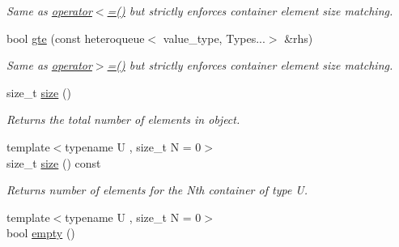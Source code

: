 \begin{DoxyCompactItemize}
\begin{DoxyCompactList}\small\item\em Same as \hyperlink{classheterogeneous_1_1heteroqueue_3_01_t_00_01_types_8_8_8_4_ac442daf94f1dc7d753cd7d493b988ae2}{operator$<$=()} but strictly enforces container element size matching. \end{DoxyCompactList}\item 
\hypertarget{classheterogeneous_1_1heteroqueue_3_01_t_00_01_types_8_8_8_4_a730338a283ed0afe915ab233284dc4c9}{}bool \hyperlink{classheterogeneous_1_1heteroqueue_3_01_t_00_01_types_8_8_8_4_a730338a283ed0afe915ab233284dc4c9}{gte} (const heteroqueue$<$ value\+\_\+type, Types...$>$ \&rhs)\label{classheterogeneous_1_1heteroqueue_3_01_t_00_01_types_8_8_8_4_a730338a283ed0afe915ab233284dc4c9}

\begin{DoxyCompactList}\small\item\em Same as \hyperlink{classheterogeneous_1_1heteroqueue_3_01_t_00_01_types_8_8_8_4_a90fc06bb3197e552ff70604cc13fe181}{operator$>$=()} but strictly enforces container element size matching. \end{DoxyCompactList}\item 
\hypertarget{classheterogeneous_1_1heteroqueue_3_01_t_00_01_types_8_8_8_4_a93597985de43832cabcff78132175757}{}size\+\_\+t \hyperlink{classheterogeneous_1_1heteroqueue_3_01_t_00_01_types_8_8_8_4_a93597985de43832cabcff78132175757}{size} ()\label{classheterogeneous_1_1heteroqueue_3_01_t_00_01_types_8_8_8_4_a93597985de43832cabcff78132175757}

\begin{DoxyCompactList}\small\item\em Returns the total number of elements in object. \end{DoxyCompactList}\item 
\hypertarget{classheterogeneous_1_1heteroqueue_3_01_t_00_01_types_8_8_8_4_a9004bffa718026641b3b6707d5f29298}{}{\footnotesize template$<$typename U , size\+\_\+t N = 0$>$ }\\size\+\_\+t \hyperlink{classheterogeneous_1_1heteroqueue_3_01_t_00_01_types_8_8_8_4_a9004bffa718026641b3b6707d5f29298}{size} () const \label{classheterogeneous_1_1heteroqueue_3_01_t_00_01_types_8_8_8_4_a9004bffa718026641b3b6707d5f29298}

\begin{DoxyCompactList}\small\item\em Returns number of elements for the Nth container of type U. \end{DoxyCompactList}\item 
\hypertarget{classheterogeneous_1_1heteroqueue_3_01_t_00_01_types_8_8_8_4_a1c0f7f0fa7a05de2327e66e965f58379}{}{\footnotesize template$<$typename U , size\+\_\+t N = 0$>$ }\\bool \hyperlink{classheterogeneous_1_1heteroqueue_3_01_t_00_01_types_8_8_8_4_a1c0f7f0fa7a05de2327e66e965f58379}{empty} ()\label{classheterogeneous_1_1heteroqueue_3_01_t_00_01_types_8_8_8_4_a1c0f7f0fa7a05de2327e66e965f58379}


\end{DoxyCompactItemize}
